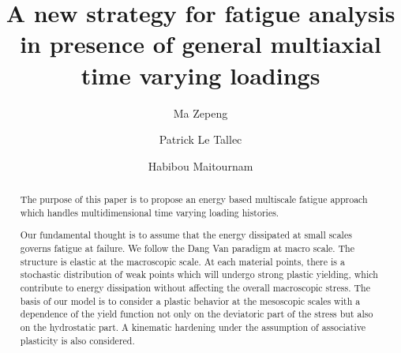 \documentclass[3p,times,procedia,number]{elsarticle}
\begin{document}
\begin{frontmatter}



\title{A new strategy for fatigue analysis in presence of general multiaxial time varying loadings}




\author[a]{Ma Zepeng}
\author[b]{Patrick Le Tallec}
\author[c]{Habibou Maitournam}

\address[a]{Laboratory of Solid Mechanics, Ecole Polytechnique, 91128 Palaiseau Cedex, France}
\address[b]{Laboratory of Solid Mechanics, Ecole Polytechnique, 91128 Palaiseau Cedex, France}
\address[c]{IMSIA, ENSTA ParisTech, CNRS, CEA, EDF, Université Paris-Saclay, 828 bd des Maréchaux, 91762 Palaiseau cedex France}

\begin{abstract}
The purpose of this paper is to propose an energy based multiscale fatigue approach which handles multidimensional time varying loading histories.

Our fundamental thought is to assume that the energy dissipated at small scales governs fatigue at failure. We follow the Dang Van paradigm at macro scale. The structure is elastic at the macroscopic scale. At each material points, there is a stochastic distribution of weak points which will undergo strong plastic yielding, which contribute to energy dissipation without affecting the overall macroscopic stress. The basis of our model is to consider a plastic behavior at the mesoscopic scales with a dependence of the yield function not only on the deviatoric part of the stress but also on the hydrostatic part. A kinematic hardening under the assumption of associative plasticity is also considered. 


\end{abstract}
\end{frontmatter}
\end{document}
